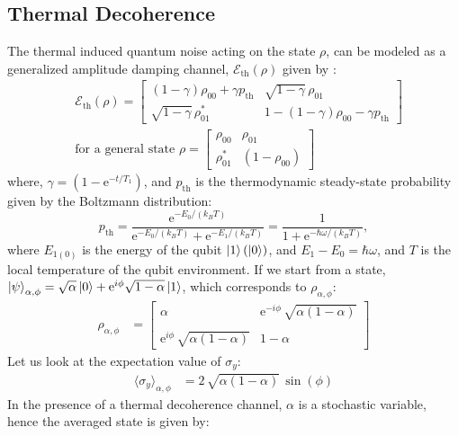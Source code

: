 \subsection{Thermal Decoherence}
The thermal induced quantum noise acting on the state $\rho$, can be modeled as a generalized amplitude damping channel, $\mathcal{E}_{\text{th}}(\rho)$ given by \cite{Nielsen_Chuang_2010}:
\begin{align}
    &\mathcal{E}_{\text{th}}(\rho) = 
\begin{bmatrix}
(1 - \gamma)\rho_{00} + \gamma p_{\text{th}} & \sqrt{1 - \gamma} \, \rho_{01} \\
\sqrt{1 - \gamma} \, \rho_{01}^* & 1 - (1 - \gamma)\rho_{00} - \gamma p_{\text{th}}
\end{bmatrix}\\
&\text{for a general state }
\rho = 
\begin{bmatrix}
\rho_{00}& \rho_{01} \\
\rho_{01}^* & (1 - \rho_{00})
\end{bmatrix}
\end{align}
where, $\gamma = (1- \text{e}^{-t/T_{1}})$, and $p_{\text{th}}$ is the thermodynamic steady-state probability given by the Boltzmann distribution:
\begin{equation}
    p_{\text{th}} = \frac{\text{e}^{-E_0 / (k_B T)}}{\text{e}^{-E_0 / (k_B T)} + \text{e}^{-E_1 / (k_B T)}} 
= \frac{1}{1 + \text{e}^{-\hbar\omega / (k_B T)}},
\end{equation}
where $E_{1(0)}$ is the energy of the qubit $\ket{1}(\ket{0})$, and $E_1 - E_0 = \hbar\omega$, and $T$ is the local temperature of the qubit environment.
If we start from a state, $\ket{\psi}_{\alpha,\phi} = \sqrt{\alpha}\ket{0} + \text{e}^{i\phi}\sqrt{1-\alpha}\ket{1}$, which corresponds to $\rho_{\alpha,\phi}$:
\begin{align}    \rho_{\alpha,\phi} &= 
    \begin{bmatrix} 
    \alpha & \text{e}^{-i\phi} \, \sqrt{\alpha(1-\alpha)}\\\\
    \text{e}^{i\phi} \, \sqrt{\alpha(1-\alpha)} & 1 - \alpha
    \end{bmatrix} 
\end{align}
Let us look at the expectation value of $\sigma_y$:
\begin{align}
    \langle\sigma_{y}\rangle_{\alpha,\phi} &= 
    2 \, \sqrt{\alpha(1-\alpha)} \, \sin(\phi)
\end{align}
In the presence of a thermal decoherence channel, $\alpha$ is a stochastic variable, hence the averaged state is given by:
